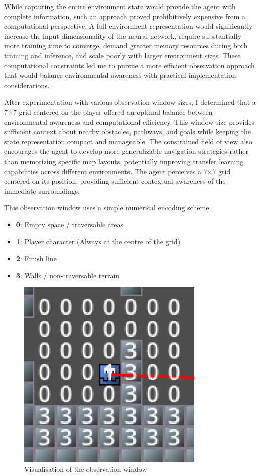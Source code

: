 While capturing the entire environment state would provide the agent with complete information, such an approach proved prohibitively expensive from a computational perspective. A full environment representation would
significantly increase the input dimensionality of the neural network, require substantially more training time to converge, demand greater memory resources during both training and inference, and scale poorly with larger environment sizes. 
These computational constraints led me to pursue a more efficient observation approach that would balance environmental awareness with practical implementation considerations.

After experimentation with various observation window sizes, I determined that a 7×7 grid centered on the player offered an optimal balance between environmental awareness and computational efficiency. 
This window size provides sufficient context about nearby obstacles, pathways, and goals while keeping the state representation compact and manageable. 
The constrained field of view also encourages the agent to develop more generalizable navigation strategies rather than memorizing specific map layouts, potentially improving transfer learning capabilities across different environments.
The agent perceives a 7×7 grid centered on its position, providing sufficient contextual awareness of the immediate surroundings.

This observation window uses a simple numerical encoding scheme:
\begin{itemize}
    \item \textbf{0}: Empty space / traversable areas 
    \item \textbf{1}: Player character (Always at the centre of the grid)
    \item \textbf{2}: Finish line
    \item \textbf{3}: Walls / non-traversable terrain
\end{itemize}

\begin{figure}[H]
    \centering
    \includegraphics[width=0.8\textwidth]{figures/observation_window}
    \caption{Visualisation of the observation window}
    \label{fig:observation_window}
\end{figure}

